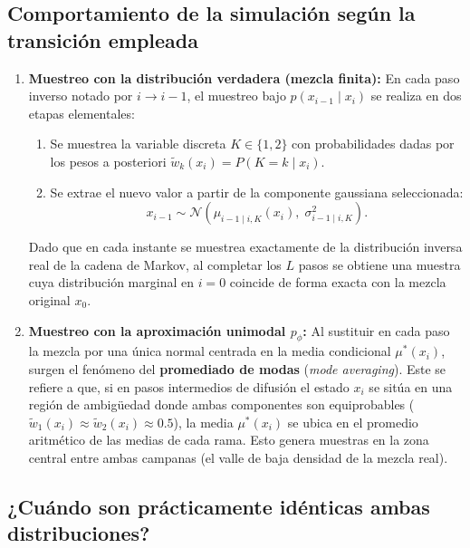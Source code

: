 \documentclass[11pt,a4paper]{article}
\begin{document}
\subsection{Comportamiento de la simulación según la transición empleada}

\begin{enumerate}
    \item \textbf{Muestreo con la distribución verdadera (mezcla finita):}
    En cada paso inverso notado por $i \to i-1$, el muestreo bajo $p(x_{i-1} \mid x_i)$ se realiza en dos etapas elementales:
    \begin{enumerate}
        \item Se muestrea la variable discreta $K \in \{1, 2\}$ con probabilidades dadas por los pesos a posteriori $\tilde{w}_k(x_i) = P(K = k \mid x_i)$.
        \item Se extrae el nuevo valor a partir de la componente gaussiana seleccionada:
        \[
        x_{i-1} \sim \mathcal{N}\left(\mu_{i-1\mid i, K}(x_i), \; \sigma_{i-1\mid i, K}^2\right).
        \]
    \end{enumerate}
    Dado que en cada instante se muestrea exactamente de la distribución inversa real de la cadena de Markov, al completar los $L$ pasos se obtiene una muestra cuya distribución marginal en $i = 0$ coincide de forma exacta con la mezcla original $x_0$.

    \item \textbf{Muestreo con la aproximación unimodal $p_\phi$:}
    Al sustituir en cada paso la mezcla por una única normal centrada en la media condicional $\mu^*(x_i)$, surgen el fenómeno del \textbf{promediado de modas} (\textit{mode averaging}). Este se refiere a que, si en pasos intermedios de difusión el estado $x_i$ se sitúa en una región de ambigüedad donde ambas componentes son equiprobables ($\tilde{w}_1(x_i) \approx \tilde{w}_2(x_i) \approx 0.5$), la media $\mu^*(x_i)$ se ubica en el promedio aritmético de las medias de cada rama. Esto genera muestras en la zona central entre ambas campanas (el valle de baja densidad de la mezcla real).
\end{enumerate}

\subsection{¿Cuándo son prácticamente idénticas ambas distribuciones?}
\end{document}
